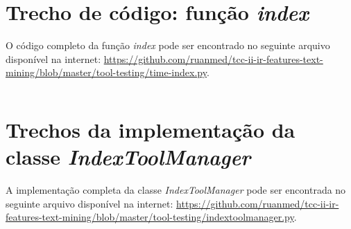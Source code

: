 \begin{apendicesenv}
    \partapendices
    
    \chapter{Trecho de código: função \textit{index}} \label{apên:função-index}
    O código completo da função \textit{index} pode ser encontrado no seguinte arquivo disponível na internet: \hyperlink{https://github.com/ruanmed/tcc-ii-ir-features-text-mining/blob/master/tool-testing/time-index.py}{https://github.com/ruanmed/tcc-ii-ir-features-text-mining/blob/master/tool-testing/time-index.py}.
    \inputminted[bgcolor=bg, 
                tabsize=4, baselinestretch=1, breaklines]{python}{codes/function-index.py}
    
    \chapter{Trechos da implementação da classe \textit{IndexToolManager}} \label{apên:implementação-indextoolmanager}
    A implementação completa da classe \textit{IndexToolManager} pode ser encontrada no seguinte arquivo disponível na internet: \hyperlink{https://github.com/ruanmed/tcc-ii-ir-features-text-mining/blob/master/tool-testing/indextoolmanager.py}{https://github.com/ruanmed/tcc-ii-ir-features-text-mining/blob/master/tool-testing/indextoolmanager.py}.
    \inputminted[bgcolor=bg, 
                tabsize=4, baselinestretch=1, breaklines]{python}{codes/indextoolmanager.py}

\end{apendicesenv}
    